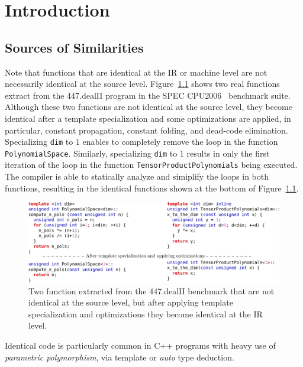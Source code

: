 
\chapter{Introduction}

\section{Sources of Similarities}

Note that functions that are identical at the IR or machine level are not
necessarily identical at the source level.
Figure~\ref{fig:identical-example} shows two real functions extract from the
447.dealII program in the SPEC CPU2006~\cite{spec} benchmark suite.
Although these two functions are not identical at the source level, they become
identical after a template specialization and some optimizations are applied, in
particular, constant propagation, constant folding, and dead-code elimination. 
Specializing \verb|dim| to $1$ enables to completely remove the loop in the
function \verb|PolynomialSpace|.
Similarly, specializing \verb|dim| to $1$ results in only the first iteration
of the loop in the function \verb|TensorProductPolynomials| being executed.
The compiler is able to statically analyze and simiplify the loops in both
functions, resulting in the identical functions shown at the bottom of
Figure~\ref{fig:identical-example}.

\begin{figure}[h]
\centering
\includegraphics[width=\textwidth]{src/intro/figs/identical-example}
\caption{Two function extracted from the 447.dealII benchmark that are not
           identical at the source level, but after applying template
           specialization and optimizations they become identical at the IR
           level.}
\label{fig:identical-example}
\end{figure}


Identical code is particularly common in C++ programs
with heavy use of \textit{parametric polymorphism}, via template or \textit{auto} type deduction.
